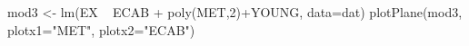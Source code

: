 \begin{Schunk}
\begin{Sinput}
 mod3 <- lm(EX  ~  ECAB + poly(MET,2)+YOUNG, data=dat)
 plotPlane(mod3, plotx1="MET", plotx2="ECAB")
\end{Sinput}
\end{Schunk}
